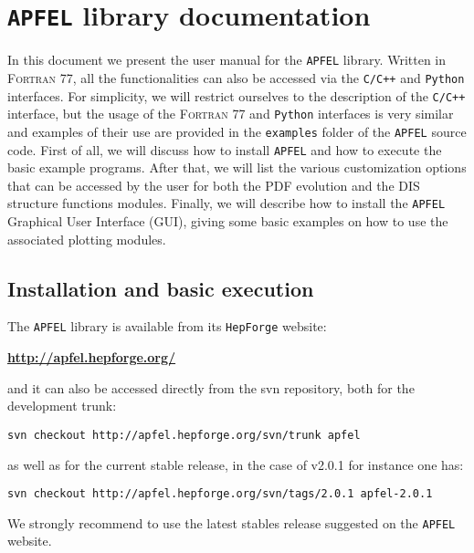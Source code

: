 \documentclass[11pt,a4paper]{article}
\begin{document}
\tableofcontents

\section{{\tt APFEL} library documentation}\label{sec-manual}

In this document we present the user manual for the  {\tt APFEL} library.
%
Written in {\scshape Fortran 77},
all the functionalities can also be accessed via the  {\tt C/C++} and
 {\tt Python} interfaces. 
%
For simplicity, we will restrict ourselves to the
description of the {\tt C/C++} interface, but the usage of
the {\scshape Fortran 77} and  {\tt Python} interfaces is
very similar and examples of their use are provided 
in the {\tt examples} folder of the {\tt APFEL} source code.
%
First of all, we will discuss how to install {\tt APFEL}  and how to execute the basic
example programs. After that, we will 
list the various customization options that can
be accessed by the user for both the PDF evolution and the DIS structure functions modules.
%
%
Finally, we will describe how to install the {\tt APFEL} Graphical
User Interface (GUI), giving some basic examples on how to use the associated plotting modules.

\subsection{Installation and basic execution}

The  {\tt APFEL} library is available from its {\tt HepForge} website:
\begin{center}
{\bf \url{http://apfel.hepforge.org/}~}
\end{center}
and it can also be accessed directly from the svn repository, both
for the development trunk:
\begin{center}
\tt svn checkout http://apfel.hepforge.org/svn/trunk apfel
\end{center}
as well as for the current stable release, in the case of v2.0.1
for instance one has:
\begin{center}
\tt svn checkout http://apfel.hepforge.org/svn/tags/2.0.1 apfel-2.0.1
\end{center}
We strongly recommend to use the latest stables release suggested on
the {\tt APFEL} website.
\end{document}
